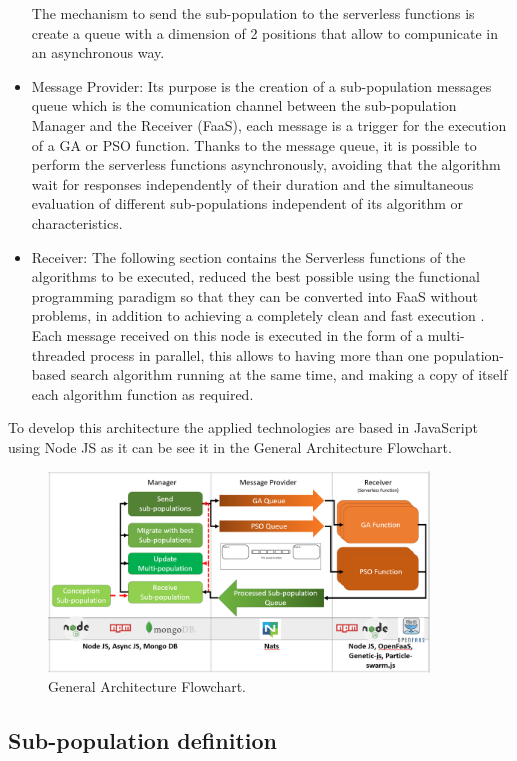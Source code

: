 \documentclass[runningheads]{llncs}
\begin{document}
\begin{itemize}
  The mechanism to send the sub-population to the serverless functions is create a queue
  with a dimension of 2 positions that allow to compunicate in an asynchronous way.
\item Message Provider: Its purpose is the creation of a sub-population messages
queue which is the comunication channel between the sub-population Manager and
the Receiver (FaaS), each message is a trigger for the execution of a GA or PSO
function. Thanks to the message queue, it is possible to perform the serverless
functions asynchronously, avoiding that the algorithm wait for responses
independently of their duration and the simultaneous evaluation of different
sub-populations independent of its algorithm or characteristics.
\item Receiver: The following section contains the Serverless functions of the
algorithms to be executed, reduced the best possible using the functional
programming paradigm so that they can be converted into FaaS without problems,
in addition to achieving a completely clean and fast execution
\cite{Roberts2016} . Each message received on this node is executed in the form
of a multi-threaded process in parallel, this allows to having more than one
population-based search algorithm running at the same time, and making a copy of
itself each algorithm function as required.
\end{itemize}

To develop this architecture the applied technologies are based in JavaScript
using Node JS as it can be see it in the General Architecture Flowchart.

\begin{figure}[htp]
  \centering
  \includegraphics[width=0.9\textwidth]{img/general diagram architecture 2.png}
  \caption{General Architecture Flowchart.} \label{fig2}
  \end{figure}

\subsection{Sub-population definition}
\end{document}
